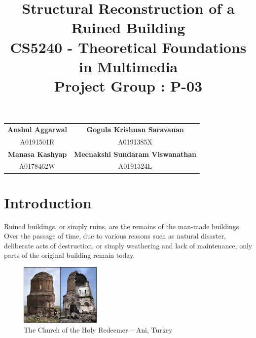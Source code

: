 \documentclass[12pt,a4paper]{article}
\title{\vspace{-1.5cm}\huge{Structural Reconstruction of a Ruined Building}\\ \vspace{0.7cm}\large{CS5240 - Theoretical Foundations in Multimedia}\\
    \large{Project Group : P-03}}
\date{}
\begin{document}
    
    \maketitle
    \vspace{-2cm}
    \begin{table}[h]
        \centering
        \begin{tabular}{cc}
            \textbf{\large{Anshul Aggarwal}} & \textbf{\large{Gogula Krishnan Saravanan}}      \vspace{0.2cm}\\
            A0191501R                & A0191385X                               \vspace{0.5cm}\\
            \textbf{\large{Manasa Kashyap}}  & \textbf{\large{Meenakshi Sundaram Viswanathan}} \vspace{0.2cm}\\
            A0178462W                & A0191324L                              
        \end{tabular}
    \end{table}
    
    
    
    \section{Introduction}
    
    Ruined buildings, or simply ruins, are the remains of the man-made buildings. Over the passage of time, due to various reasons such as natural disaster, deliberate acts of destruction, or simply weathering and lack of maintenance, only parts of the original building remain today.
    
    \begin{figure}
        \centering
        \captionsetup{justification=centering}
        
        \includegraphics[width=0.35\textwidth]{ruins.jpg}
        
        \caption{The Church of the Holy Redeemer -- Ani, Turkey}
        \label{fig:ruins}
    \end{figure}
    
\end{document}
